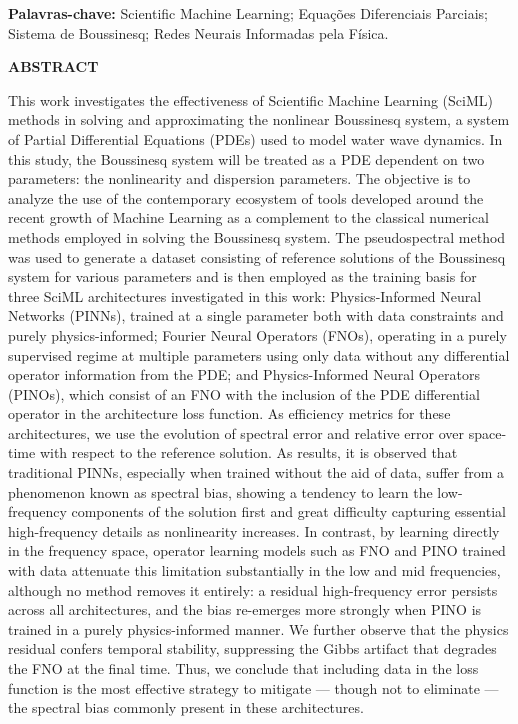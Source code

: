 \vspace{1cm}
\noindent
\textbf{Palavras-chave:} Scientific Machine Learning; Equações Diferenciais Parciais; Sistema de Boussinesq; Redes Neurais Informadas pela Física.

\pagebreak

\begin{center}
\textbf{ABSTRACT}
\end{center}
\noindent This work investigates the effectiveness of Scientific Machine Learning (SciML) methods in solving and approximating the nonlinear 
Boussinesq system, a system of Partial Differential Equations (PDEs) used to model water wave dynamics. In this study, the Boussinesq system will 
be treated as a PDE dependent on two parameters: the nonlinearity and dispersion parameters. The objective is to analyze the use of the contemporary 
ecosystem of tools developed around the recent growth of Machine Learning as a complement to the classical numerical methods employed in solving the 
Boussinesq system. The pseudospectral method was used to generate a dataset consisting of reference solutions of the Boussinesq system for various 
parameters and is then employed as the training basis for three SciML architectures investigated in this work: Physics-Informed Neural Networks (PINNs), 
trained at a single parameter both with data constraints and purely physics-informed; Fourier Neural Operators (FNOs), operating in a purely supervised 
regime at multiple parameters using only data without any differential operator information from the PDE; and Physics-Informed Neural Operators (PINOs), 
which consist of an FNO with the inclusion of the PDE differential operator in the architecture loss function. As efficiency metrics for these architectures, 
we use the evolution of spectral error and relative error over space-time with respect to the reference solution. As results, it is observed that traditional PINNs, 
especially when trained without the aid of data, suffer from a phenomenon known as spectral bias, showing a tendency to learn the low-frequency components of the solution 
first and great difficulty capturing essential high-frequency details as nonlinearity increases. In contrast, by learning directly in the frequency space, operator learning
models such as FNO and PINO trained with data attenuate this limitation substantially in the low and mid frequencies, although no method removes it entirely: a residual
high-frequency error persists across all architectures, and the bias re-emerges more strongly when PINO is trained in a purely physics-informed manner. We further observe
that the physics residual confers temporal stability, suppressing the Gibbs artifact that degrades the FNO at the final time. Thus, we conclude that including data in the
loss function is the most effective strategy to mitigate --- though not to eliminate --- the spectral bias commonly present in these architectures.

